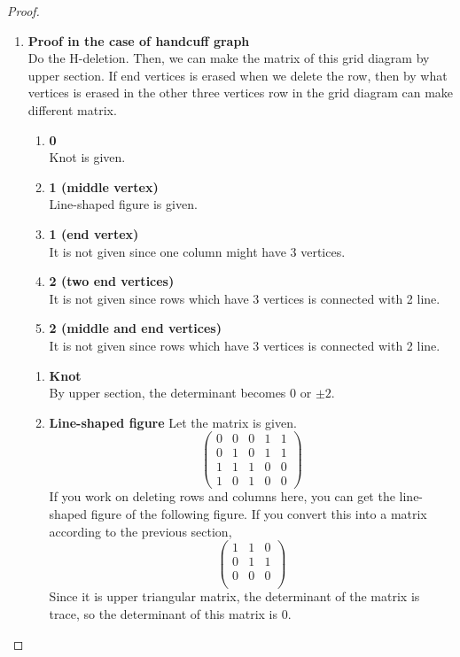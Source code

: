 \documentclass{article}
\theoremstyle{definition}
\theoremstyle{theorem}
\theoremstyle{proposition}
\theoremstyle{corollary}
\begin{document}
\begin{proof}
\begin{enumerate}
\item \textbf{Proof in the case of handcuff graph}\\
    Do the H-deletion. Then, we can make the matrix of this grid diagram by upper section. If end vertices is erased when we delete the row, then by what vertices is erased in the other three vertices row in the grid diagram can make different matrix.
    \begin{enumerate}
        \item \textbf{0}\\
        Knot is given.
        \item \textbf{1 (middle vertex)}\\
        Line-shaped figure is given.
        \item \textbf{1 (end vertex)}\\
        It is not given since one column might have 3 vertices.
        \item \textbf{2 (two end vertices)}\\
        It is not given since rows which have 3 vertices is connected with 2 line.
        \item \textbf{2 (middle and end vertices)}\\
        It is not given since rows which have 3 vertices is connected with 2 line.
    \end{enumerate}
    
    \begin{enumerate}[label={(\roman*)}]
        \item \textbf{Knot}\\
        By upper section, the determinant becomes 0 or $\pm 2$.
        \item \textbf{Line-shaped figure}
        Let the matrix is given.
        $$\begin{pmatrix}
            0 & 0 & 0 & 1 & 1\\
            0 & 1 & 0 & 1 & 1\\
            1 & 1 & 1 & 0 & 0\\
            1 & 0 & 1 & 0 & 0
        \end{pmatrix}$$
        If you work on deleting rows and columns here, you can get the line-shaped figure of the following figure. If you convert this into a matrix according to the previous section,
        $$\begin{pmatrix}
            1 & 1 & 0 \\
            0 & 1 & 1 \\
            0 & 0 & 0 \\
        \end{pmatrix}$$
        Since it is upper triangular matrix, the determinant of the matrix is trace, so the determinant of this matrix is 0.
    \end{enumerate}
\end{enumerate}
\end{proof}
\end{document}
